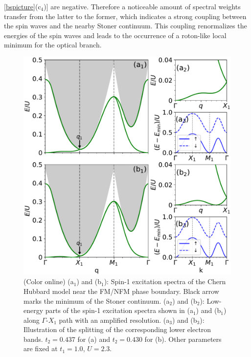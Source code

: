 \documentclass[amsmath,superscriptaddress,showpacs,aps,prb,twocolumn]{revtex4-1}
\begin{document}
\ref{bspicture}($\text{c}_4$)] are negative. Therefore a noticeable amount of spectral weights transfer from the latter to the former, which indicates a strong coupling between the spin waves and the nearby Stoner continuum. This coupling renormalizes the energies of the spin waves and leads to the occurrence of a roton-like local minimum for the optical branch.

\begin{figure}
\includegraphics[width=\columnwidth]{pbcispectrum}
\caption{(Color online) (a$_1$) and (b$_1$): Spin-1 excitation spectra of the Chern Hubbard model near the FM/NFM phase boundary. Black arrow marks the minimum of the Stoner continuum. (a$_2$) and (b$_2$): Low-energy parts of the spin-1 excitation spectra shown in (a$_1$) and (b$_1$) along $\Gamma$-$X_1$ path with an amplified resolution. (a$_3$) and (b$_3$): Illustration of the splitting of the corresponding lower electron bands. $t_2=0.437$ for (a) and $t_2=0.430$ for (b). Other parameters are fixed at $t_1=1.0$, $U=2.3$.}
\label{pbcispectrum}
\end{figure}
\end{document}
